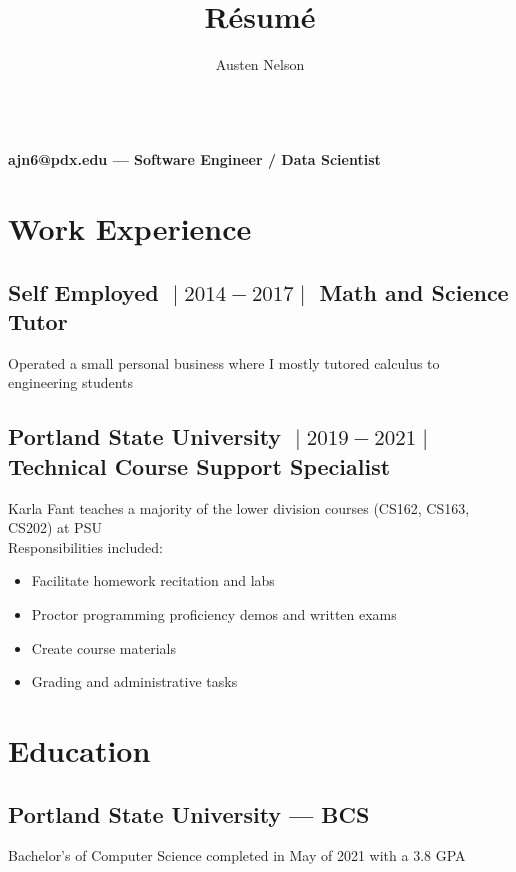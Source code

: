 \documentclass{article}
\title{R\'esum\'e}
\author{Austen Nelson}
\makeatletter
\renewcommand{\maketitle}
{
\begin{center}
\huge \bfseries \theauthor\\
\vspace{.25em}
\mdseries \normalsize ajn6@pdx.edu --- Software Engineer / Data Scientist
\end{center}
}
\makeatother
\begin{document}
\maketitle

\section{Work Experience}

\subsection{Self Employed $\;\vert\;2014-2017\;\vert\;$ Math and Science Tutor}
Operated a small personal business where I mostly tutored calculus to
engineering students

\subsection{Portland State University $\;\vert\;2019-2021\;\vert\;$ Technical Course Support Specialist}
Karla Fant teaches a majority of the lower division courses (CS162, CS163, CS202) at PSU\\
Responsibilities included:

\begin{itemize}
\item Facilitate homework recitation and labs
\item Proctor programming proficiency demos and written exams
\item Create course materials
\item Grading and administrative tasks
\end{itemize}

\section{Education}

\subsection{Portland State University --- BCS}
Bachelor's of Computer Science completed in May of 2021 with a 3.8 GPA
\end{document}
